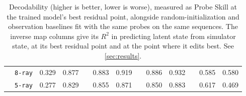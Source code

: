 \documentclass{article} %
\begin{document}
\begin{table}[t]
\begin{tabular}{ll PP G PP G PP G PP}
& \texttt{8-ray}    & 0.329 & 0.877 & & 0.883 & 0.919 & & 0.886 & 0.932 & & 0.585 & 0.580 \\
& \texttt{5-ray}    & 0.277 & 0.829 & & 0.855 & 0.871 & & 0.850 & 0.883 & & 0.617 & 0.469 \\
\hline
\end{tabular}
\caption{Decodability (\textcolor{heatHiTxt}{higher} is better, \textcolor{heatLo}{lower} is worse), measured as Probe Skill at the trained model's best residual point, alongside random-initialization and observation baselines fit with the same probes on the same sequences. The inverse map columns give its $R^2$ in predicting latent state from simulator state, at its best residual point and at the point where it edits best. See \cref{sec:results}.}
\label{tab:decodability}

\vspace{0.75em}



\end{table}
\end{document}
